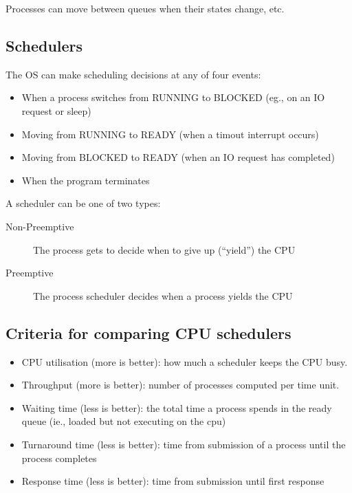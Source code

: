 \begin{note}
	Processes can move between queues when their states change, etc.
\end{note}

\subsection{Schedulers}\label{sub:schedulers}

The OS can make scheduling decisions at any of four events:
\begin{itemize}
	\item When a process switches from RUNNING to BLOCKED (eg., on an IO request or sleep)
	\item Moving from RUNNING to READY (when a timout interrupt occurs)
	\item Moving from BLOCKED to READY (when an IO request has completed)
	\item When the program terminates
\end{itemize}
A scheduler can be one of two types:
\begin{description}
	\item[Non-Preemptive] The process gets to decide when to give up (``yield'') the CPU
	\item[Preemptive] The process scheduler decides when a process yields the CPU
\end{description}

\subsection{Criteria for comparing CPU schedulers}\label{sub:criteria_for_comparing_cpu_shcedulers}

\begin{itemize}
	\item CPU utilisation (more is better): how much a scheduler keeps the CPU busy.
	\item Throughput (more is better): number of processes computed per time unit.
	\item Waiting time (less is better): the total time a process spends in the ready queue (ie., loaded but not executing on the cpu)
	\item Turnaround time (less is better): time from submission of a process until the process completes
	\item Response time (less is better): time from submission until first response
\end{itemize}

